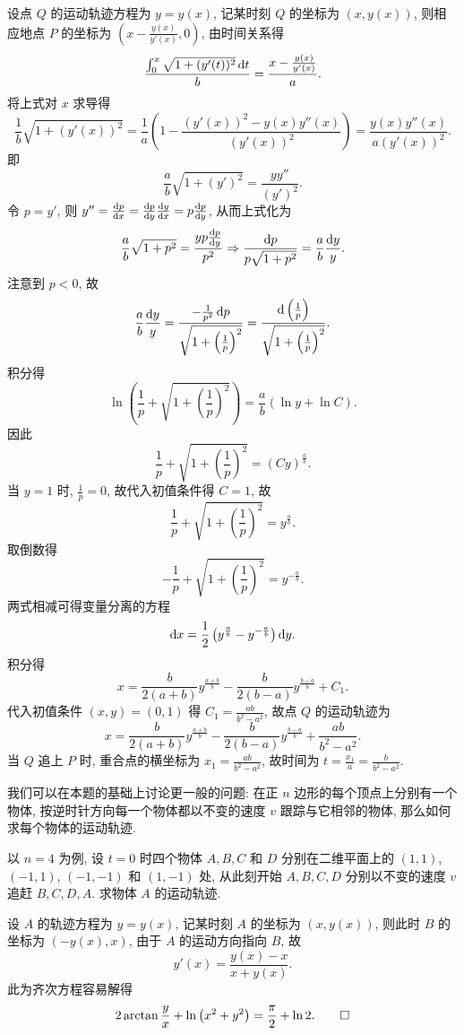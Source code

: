 \begin{solution}
  设点 $Q$ 的运动轨迹方程为 $y=y(x)$, 记某时刻 $Q$ 的坐标为 $(x,y(x))$,
  则相应地点 $P$ 的坐标为 $\left(x-\frac{y(x)}{y'(x)},0\right)$, 由时间关系得
  \[\frac{\int_0^x\sqrt{1+(y'(t))^2}\mathop{}\!\mathrm{d} t}{b}=\frac{x-\frac{y(x)}{y'(x)}}{a}.\]
  将上式对 $x$ 求导得
  \[\frac{1}{b}\sqrt{1+(y'(x))^2}=\frac{1}{a}\left(1-\frac{(y'(x))^2-y(x)y''(x)}{(y'(x))^2}\right)
    = \frac{y(x)y''(x)}{a(y'(x))^2}.\]
  即
  \[\frac{a}{b}\sqrt{1+(y')^2}=\frac{yy''}{(y')^2}.\]
  令 $p=y'$, 则 $y''=\frac{\diff p}{\diff x}=\frac{\diff p}{\diff y}\frac{\diff y}{\diff x}=p\frac{\diff p}{\diff y}$,
  从而上式化为
  \[\frac{a}{b}\sqrt{1+p^2}=\frac{yp\frac{\mathop{}\!\mathrm{d} p}{\mathop{}\!\mathrm{d} y}}{p^2}
    \Rightarrow\frac{\mathop{}\!\mathrm{d} p}{p\sqrt{1+p^2}}=\frac{a}{b}\frac{\mathop{}\!\mathrm{d} y}{y}.\]
  注意到 $p<0$, 故
  \[\frac{a}{b}\frac{\mathop{}\!\mathrm{d} y}{y}=\frac{-\frac{1}{p^2}\mathop{}\!\mathrm{d} p}{\sqrt{1+\left(\frac{1}{p}\right)^2}}
    = \frac{\mathop{}\!\mathrm{d}\left(\frac{1}{p}\right)}{\sqrt{1+\left(\frac{1}{p}\right)^2}}.\]
  积分得
  \[\ln\left(\frac{1}{p}+\sqrt{1+\left(\frac{1}{p}\right)^2}\right)=\frac{a}{b}(\ln y+\ln C).\]
  因此
  \[\frac{1}{p}+\sqrt{1+\left(\frac{1}{p}\right)^2}=(Cy)^{\frac{a}{b}}.\]
  当 $y=1$ 时, $\frac{1}{p}=0$, 故代入初值条件得 $C=1$, 故
  \[\frac{1}{p}+\sqrt{1+\left(\frac{1}{p}\right)^2}=y^{\frac{a}{b}}.\]
  取倒数得
  \[-\frac{1}{p}+\sqrt{1+\left(\frac{1}{p}\right)^2}=y^{-\frac{a}{b}}.\]
  两式相减可得变量分离的方程
  \[\mathop{}\!\mathrm{d} x=\frac{1}{2}\left(y^{\frac{a}{b}}-y^{-\frac{a}{b}}\right)\mathop{}\!\mathrm{d} y.\]
  积分得
  \[x=\frac{b}{2(a+b)}y^{\frac{a+b}{b}}-\frac{b}{2(b-a)}y^{\frac{b-a}{b}}+C_1.\]
  代入初值条件 $(x,y)=(0,1)$ 得 $C_1=\frac{ab}{b^2-a^2}$, 故点 $Q$ 的运动轨迹为
  \[x=\frac{b}{2(a+b)}y^{\frac{a+b}{b}}-\frac{b}{2(b-a)}y^{\frac{b-a}{b}}+\frac{ab}{b^2-a^2}.\]
  当 $Q$ 追上 $P$ 时, 重合点的横坐标为 $x_1=\frac{ab}{b^2-a^2}$,
  故时间为 $t=\frac{x_1}{a}=\frac{b}{b^2-a^2}$.
\end{solution}
我们可以在本题的基础上讨论更一般的问题: 在正 $n$ 边形的每个顶点上分别有一个物体,
按逆时针方向每一个物体都以不变的速度 $v$ 跟踪与它相邻的物体, 那么如何求每个物体的运动轨迹.

以 $n=4$ 为例, 设 $t=0$ 时四个物体 $A,B,C$ 和 $D$ 分别在二维平面上的
$(1,1)$, $(-1,1)$, $(-1,-1)$ 和 $(1,-1)$ 处,
从此刻开始 $A,B,C,D$ 分别以不变的速度 $v$ 追赶 $B,C,D,A$. 求物体 $A$ 的运动轨迹.
\begin{solution}
  设 $A$ 的轨迹方程为 $y=y(x)$, 记某时刻 $A$ 的坐标为 $(x,y(x))$,
  则此时 $B$ 的坐标为 $(-y(x),x)$, 由于 $A$ 的运动方向指向 $B$, 故
  \[y'(x)=\frac{y(x)-x}{x+y(x)}.\]
  此为齐次方程容易解得
  \[2\arctan\frac{y}{x}+\ln\left(x^2+y^2\right)=\frac{\pi}{2}+\ln 2.\qedhere\]
\end{solution}



